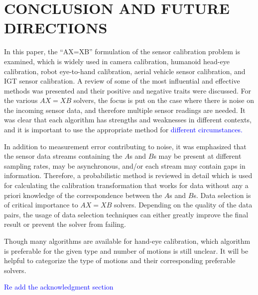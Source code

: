 \documentclass[twocolumn,10pt]{asme2ej}
\begin{document}
\section{CONCLUSION AND FUTURE DIRECTIONS}
\label{sec:conclusion}
In this paper, the ``AX=XB'' formulation of the sensor calibration problem is examined, which is widely used in camera calibration, humanoid head-eye calibration, robot eye-to-hand calibration, aerial vehicle sensor calibration, and IGT sensor calibration. A review of some of the most influential and effective methods was presented and their positive and negative traits were discussed. For the various $AX=XB$ solvers, the focus is put on the case where there is noise on the incoming sensor data, and therefore multiple sensor readings are needed. It was clear that each algorithm has strengths and weaknesses in different contexts, and it is important to use the appropriate method for \textcolor{blue}{different circumstances.} %

In addition to measurement error contributing to noise, it was emphasized that the sensor data streams containing the $A$s and $B$s may be present at different sampling rates, may be asynchronous, and/or each stream may contain gaps in information. Therefore, a probabilistic method is reviewed in detail which is used for calculating the calibration transformation that works for data without any a priori knowledge of the correspondence between the $A$s and $B$s. Data selection is of critical importance to $AX=XB$ solvers. Depending on the quality of the data pairs, the usage of data selection techniques can either greatly improve the final result or prevent the solver from failing. 

Though many algorithms are available for hand-eye calibration, which algorithm is preferable for the given type and number of motions is still unclear. It will be helpful to categorize the type of motions and their corresponding preferable solvers.  

\textcolor{blue}{Re add the acknowledgment section}

\end{document}
